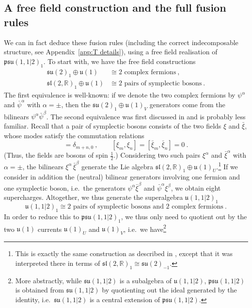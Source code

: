 \documentclass[12pt,a4paper]{article}
\newcommand{\be}{\begin{equation}}
\newcommand{\ee}{\end{equation}}
\begin{document}
\subsection{A free field construction and the full fusion rules} \label{subsec:free field representation}

We can in fact deduce these fusion rules (including the correct indecomposable structure, see Appendix~\ref{app:T details}), using a free field realisation of $\mathfrak{psu}(1,1|2)_1$. To start with, we have the free field constructions
\begin{align} 
\mathfrak{su}(2)_1 \oplus \mathfrak{u}(1) &\cong \text{2 complex fermions}\ , \\ 
\mathfrak{sl}(2,\mathds{R})_1 \oplus \mathfrak{u}(1) &\cong \text{2 pairs of symplectic bosons} \ .
\end{align}
The first equivalence is well-known: if we denote the two complex fermions by $\psi^\alpha$ and $\bar{\psi}^\alpha$ with $\alpha=\pm$, then the $\mathfrak{su}(2)_1 \oplus \mathfrak{u}(1)_V$ generators come from the bilinears $\psi^\alpha \bar{\psi}^\beta$.
The second equivalence was first discussed in \cite{Goddard:1987td} and is probably less familiar. Recall that a pair of symplectic bosons consists of the two fields $\xi$ and $\bar{\xi}$, whose modes satisfy the commutation relations
\be 
[\bar{\xi}_m,\xi_n]=\delta_{m+n,0}\ ,\qquad [\xi_m,\xi_n]=[\bar{\xi}_m,\bar{\xi}_n]=0\ .
\ee
(Thus, the fields are bosons of spin $\tfrac{1}{2}$.) Considering two such pairs $\xi^\alpha$ and $\bar{\xi}^\alpha$ with $\alpha=\pm$, the bilinears $\xi^\alpha \, \bar{\xi}^\beta$ generate the Lie algebra $\mathfrak{sl}(2,\mathds{R})_1 \oplus \mathfrak{u}(1)_U$.\footnote{This is exactly the same construction as described in \cite{Gaberdiel:2018rqv}, except that it was interpreted there in terms of $\mathfrak{sl}(2,\mathds{R})_1\cong \mathfrak{su}(2)_{-1}$.} 
If we consider in addition the (neutral) bilinear generators involving one fermion and one symplectic boson, i.e.\ the generators $\psi^\alpha \bar{\xi}^\beta$ and $\bar{\psi}^\alpha \xi^\beta$, we obtain eight supercharges. Altogether, we thus generate the superalgebra $\mathfrak{u}(1,1|2)_1$
\be 
\mathfrak{u}(1,1|2)_1 \cong \text{2 pairs of symplectic bosons and 2 complex fermions}\ .
\ee
In order to reduce this to $\mathfrak{psu}(1,1|2)_1$, we thus only need to quotient out by the two $\mathfrak{u}(1)$ currents $\mathfrak{u}(1)_U$ and $\mathfrak{u}(1)_V$, i.e.\ we have\footnote{More abstractly,  
while $\mathfrak{su}(1,1|2)$ is a subalgebra of $\mathfrak{u}(1,1|2)$, $\mathfrak{psu}(1,1|2)$ is obtained from $\mathfrak{su}(1,1|2)$ by quotienting out the ideal generated by the identity, i.e.\ $\mathfrak{su}(1,1|2)$ is a central extension of $\mathfrak{psu}(1,1|2)$.} 
\end{document}
